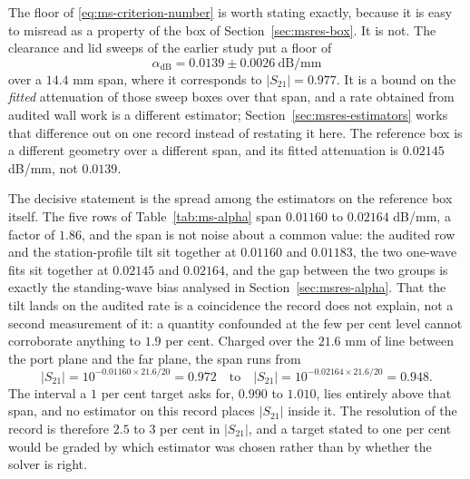 The floor of \eqref{eq:ms-criterion-number} is worth stating exactly, because it is easy to misread as a
property of the box of Section~\ref{sec:msres-box}. It is not. The clearance and lid sweeps of the earlier study
put a floor of
\begin{equation}
  \alpha_{\mathrm{dB}} = 0.0139 \pm 0.0026\ \text{dB/mm}
  \label{eq:ms-criterion-number}
\end{equation}
over a $14.4$ mm span, where it corresponds to $|S_{21}| = 0.977$. It is a bound on the \emph{fitted} attenuation
of those sweep boxes over that span, and a rate obtained from audited wall work is a different estimator;
Section~\ref{sec:msres-estimators} works that difference out on one record instead of restating it here. The
reference box is a different geometry over a different span, and its fitted attenuation is $0.02145$ dB/mm, not
$0.0139$.

The decisive statement is the spread among the estimators on the reference box itself. The five rows of
Table~\ref{tab:ms-alpha} span $0.01160$ to $0.02164$ dB/mm, a factor of $1.86$, and the span is not noise about
a common value: the audited row and the station-profile tilt sit together at $0.01160$ and $0.01183$, the two
one-wave fits sit together at $0.02145$ and $0.02164$, and the gap between the two groups is exactly the
standing-wave bias analysed in Section~\ref{sec:msres-alpha}. That the tilt lands on the audited rate is a
coincidence the record does not explain, not a second measurement of it: a quantity confounded at the few per
cent level cannot corroborate anything to $1.9$ per cent. Charged over the $21.6$ mm of line between the port
plane and the far plane, the span runs from
\begin{equation}
  |S_{21}| = 10^{-0.01160 \times 21.6/20} = 0.972
  \quad\text{to}\quad
  |S_{21}| = 10^{-0.02164 \times 21.6/20} = 0.948 .
  \label{eq:ms-criterion-span}
\end{equation}
The interval a $1$ per cent target asks for, $0.990$ to $1.010$, lies entirely above that span, and no estimator
on this record places $|S_{21}|$ inside it. The resolution of the record is therefore $2.5$ to $3$ per cent in
$|S_{21}|$, and a target stated to one per cent would be graded by which estimator was chosen rather than by
whether the solver is right.

